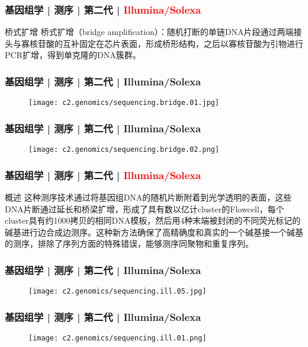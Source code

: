 \begin{frame}
  \frametitle{基因组学 | 测序 | 第二代 | \textcolor{red}{Illumina/Solexa}}
  \begin{block}{桥式扩增}
桥式扩增（bridge amplification）：随机打断的单链DNA片段通过两端接头与寡核苷酸的互补固定在芯片表面，形成桥形结构，之后以寡核苷酸为引物进行PCR扩增，得到单克隆的DNA簇群。
  \end{block}
\end{frame}

\begin{frame}
  \frametitle{基因组学 | 测序 | 第二代 | Illumina/Solexa}
  \begin{figure}
    \centering
    \texttt{[image: c2.genomics/sequencing.bridge.01.jpg]}
  \end{figure}
\end{frame}

\begin{frame}
  \frametitle{基因组学 | 测序 | 第二代 | Illumina/Solexa}
  \begin{figure}
    \centering
    \texttt{[image: c2.genomics/sequencing.bridge.02.png]}
  \end{figure}
\end{frame}

\begin{frame}
  \frametitle{基因组学 | 测序 | 第二代 | \textcolor{red}{Illumina/Solexa}}
  \begin{block}{概述}
这种测序技术通过将基因组DNA的随机片断附着到光学透明的表面，这些DNA片断通过延长和桥梁扩增，形成了具有数以亿计cluster的Flowcell，每个cluster具有约1000拷贝的相同DNA模板，然后用4种末端被封闭的不同荧光标记的碱基进行边合成边测序。这种新方法确保了高精确度和真实的一个碱基接一个碱基的测序，排除了序列方面的特殊错误，能够测序同聚物和重复序列。
  \end{block}
\end{frame}

\begin{frame}
  \frametitle{基因组学 | 测序 | 第二代 | Illumina/Solexa}
  \begin{figure}
    \centering
    \texttt{[image: c2.genomics/sequencing.ill.05.jpg]}
  \end{figure}
\end{frame}

\begin{frame}
  \frametitle{基因组学 | 测序 | 第二代 | Illumina/Solexa}
  \begin{figure}
    \centering
    \texttt{[image: c2.genomics/sequencing.ill.01.png]}
  \end{figure}
\end{frame}

